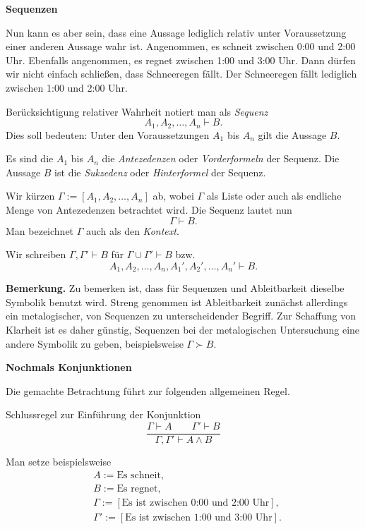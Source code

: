 \documentclass[8pt]{beamer}
\newcommand{\strong}[1]{\textsf{\textbf{#1}}}
\newcommand{\centerheadline}[1]{%
  \begin{center}\strong{#1}\end{center}}
\newcommand{\parspace}{\vspace{0.8em}}
\begin{document}
\begin{frame}
\centerheadline{Sequenzen}
\end{frame}

\begin{frame}
Nun kann es aber sein, dass eine Aussage lediglich relativ unter
Voraussetzung einer anderen Aussage wahr ist. Angenommen, es schneit
zwischen 0:00 und 2:00 Uhr. Ebenfalls angenommen, es regnet zwischen
1:00 und 3:00 Uhr. Dann dürfen wir nicht einfach schließen, dass
Schneeregen fällt. Der Schneeregen fällt lediglich zwischen
1:00 und 2:00 Uhr.\pause

\parspace
Berücksichtigung relativer Wahrheit notiert man als \emph{Sequenz}
\[A_1,A_2,\ldots,A_n\vdash B.\]
Dies soll bedeuten: Unter den Voraussetzungen $A_1$ bis $A_n$
gilt die Aussage $B$.\pause

\parspace
Es sind die $A_1$ bis $A_n$ die \emph{Antezedenzen} oder
\emph{Vorderformeln} der Sequenz. Die Aussage $B$ ist die
\emph{Sukzedenz} oder \emph{Hinterformel} der Sequenz.
\end{frame}

\begin{frame}
Wir kürzen $\Gamma := [A_1,A_2,\ldots,A_n]$ ab, wobei $\Gamma$
als Liste oder auch als endliche Menge von Antezedenzen betrachtet wird.
Die Sequenz lautet nun
\[\Gamma\vdash B.\]
Man bezeichnet $\Gamma$ auch als den \emph{Kontext}.\pause

\parspace
Wir schreiben
$\Gamma,\Gamma'\vdash B$ für $\Gamma\cup\Gamma'\vdash B$ bzw.
\[A_1,A_2,\ldots,A_n,A_1',A_2',\ldots,A_n'\vdash B.\]

\parspace
\begin{footnotesize}
\strong{Bemerkung.} Zu bemerken ist, dass für Sequenzen und Ableitbarkeit
dieselbe Symbolik benutzt wird. Streng genommen ist Ableitbarkeit zunächst
allerdings ein metalogischer, von Sequenzen zu unterscheidender Begriff.
Zur Schaffung von Klarheit ist es daher günstig, Sequenzen bei der
metalogischen Untersuchung eine andere Symbolik zu geben,
beispielsweise $\Gamma\succ B$.
\end{footnotesize}
\end{frame}

\begin{frame}
\centerheadline{Nochmals Konjunktionen}
\end{frame}

\begin{frame}
Die gemachte Betrachtung führt zur folgenden allgemeinen Regel.
\begin{block}{Schlussregel zur Einführung der Konjunktion}
\[\dfrac{\Gamma\vdash A\qquad\Gamma'\vdash B}{\Gamma,\Gamma'\vdash A\land B}\]
\end{block}\pause
Man setze beispielsweise
\begin{align*}
& A := \text{Es schneit},\\
& B := \text{Es regnet},\\
& \Gamma := [\text{Es ist zwischen 0:00 und 2:00 Uhr}],\\
& \Gamma' := [\text{Es ist zwischen 1:00 und 3:00 Uhr}].
\end{align*}
\end{frame}
\end{document}
